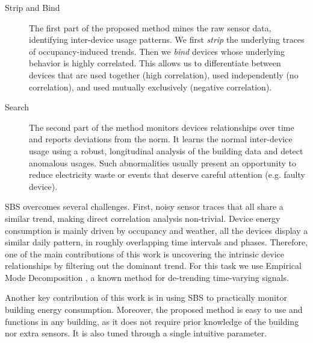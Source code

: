 \begin{description}
 \item[Strip and Bind] The first part of the proposed method mines the raw sensor data, identifying inter-device usage patterns. %
We first \emph{strip} the underlying traces of occupancy-induced trends.  Then we \emph{bind} devices  whose underlying behavior is highly correlated. %
 This allows us to differentiate between devices that are used together (high correlation), used independently (no correlation), and used mutually exclusively (negative correlation).
 \item[Search] The second part of the method monitors devices relationships over time and reports deviations from the norm.  %
 It learns the normal inter-device usage using a robust, longitudinal analysis of the building data and detect anomalous usages.  Such abnormalities usually present an opportunity to reduce electricity waste or events that deserve careful attention (e.g. faulty device).
\end{description}

SBS overcomes several challenges.  First, 
noisy sensor traces that all share a similar trend, making direct correlation analysis non-trivial.
Device energy consumption is mainly driven by occupancy and weather, all the devices display a similar daily pattern, in 
roughly overlapping time intervals and phases.
Therefore, one of the main contributions of this work is uncovering the intrinsic device relationships by filtering out the 
dominant trend.  For this task we use 
Empirical Mode Decomposition \cite{huang:emd1998}, a known method for de-trending time-varying signals.

Another key contribution of this work is in using SBS to practically monitor building energy consumption.
Moreover, the proposed method is easy to use and functions in any building, as it does not require prior knowledge of the building nor extra sensors.  
It is also tuned through a single intuitive parameter.  %

